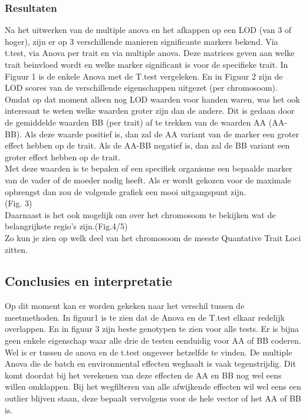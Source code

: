 \documentclass[12pt,a4paper]{article}
\begin{document}
\subsubsection*{Resultaten}
Na het uitwerken van de multiple anova en het afkappen op een LOD (van 3 of hoger), zijn er op 3 verschillende manieren significante markers bekend. 
Via t.test, via Anova per trait en via multiple anova. 
Deze matrices geven aan welke trait beinvloed wordt en welke marker significant is voor de specifieke trait.
In Figuur 1 is de enkele Anova met de T.test vergeleken. En in Figuur 2 zijn de LOD scores van de verschillende eigenschappen uitgezet (per chromosoom).
Omdat op dat moment alleen nog LOD waarden voor handen waren, was het ook interesant te weten welke waarden groter zijn dan de andere.
Dit is gedaan door de gemiddelde waarden BB (per trait) af te trekken van de waarden AA (AA-BB).
Als deze waarde positief is, dan zal de AA variant van de marker een groter effect hebben op de trait.
Als de AA-BB negatief is, dan zal de BB variant een groter effect hebben op de trait. \\
Met deze waarden is te bepalen of een specifiek organisme een bepaalde marker van de vader of de moeder nodig heeft.
Als er wordt gekozen voor de maximale opbrengst dan zou de volgende grafiek een mooi uitgangspunt zijn.\\
(Fig. 3)\\
Daarnaast is het ook mogelijk om over het chromosoom te bekijken wat de belangrijkste regio's zijn.(Fig.4/5)\\
Zo kun je zien op welk deel van het chromosoom de meeste Quantative Trait Loci zitten.
\subsection*{Conclusies en interpretatie}
Op dit moment kan er worden gekeken naar het verschil tussen de meetmethoden.
In figuur1 is te zien dat de Anova en de T.test elkaar redelijk overlappen.
En in figuur 3 zijn beste genotypen te zien voor alle tests.
Er is bijna geen enkele eigenschap waar alle drie de testen eenduidig voor AA of BB coderen.
Wel is er tussen de anova en de t.test ongeveer hetzelfde te vinden.
De multiple Anova die de batch en environmental effecten weghaalt is vaak tegenstrijdig. 
Dit komt doordat bij het verekenen van deze effecten de AA en BB nog wel eens willen omklappen.
Bij het wegfilteren van alle afwijkende effecten wil wel eens een outlier blijven staan, deze bepaalt vervolgens voor de hele vector of het AA of BB is.
\end{document}
